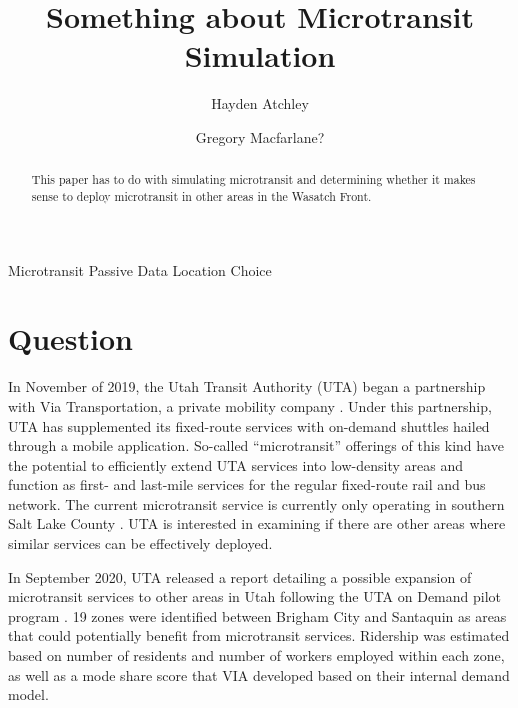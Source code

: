 \documentclass[3p, authoryear]{elsarticle} %
\begin{document}
\begin{frontmatter}

  \title{Something about Microtransit Simulation}
    \author[Brigham Young University]{Hayden Atchley}
    \author[Brigham Young University]{Gregory Macfarlane?}
      \address[Brigham Young University]{Civil and Construction Engineering Department, 430 Engineering Building, Provo, Utah 84602}
    
  \begin{abstract}
  This paper has to do with simulating microtransit and determining whether it makes sense to deploy microtransit in other areas in the Wasatch Front.
  \end{abstract}
   \begin{keyword} Microtransit Passive Data Location Choice\end{keyword}
 \end{frontmatter}

\raggedright

\hypertarget{question}{%
\section{Question}\label{question}}

In November of 2019, the Utah Transit Authority (UTA) began a partnership with Via Transportation, a private mobility company \citep{UTAreport}. Under this partnership, UTA has supplemented its fixed-route services with on-demand shuttles hailed through a mobile application. So-called ``microtransit'' offerings of this kind have the potential to efficiently extend UTA services into low-density areas and function as first- and last-mile services for the regular fixed-route rail and bus network. The current microtransit service is currently only operating in southern Salt Lake County \citep{UTAonDemand}. UTA is interested in examining if there are other areas where similar services can be effectively deployed.

In September 2020, UTA released a report detailing a possible expansion of microtransit services to other areas in Utah following the UTA on Demand pilot program \citep{UTAreport}. 19 zones were identified between Brigham City and Santaquin as areas that could potentially benefit from microtransit services. Ridership was estimated based on number of residents and number of workers employed within each zone, as well as a mode share score that VIA developed based on their internal demand model.
\end{document}
